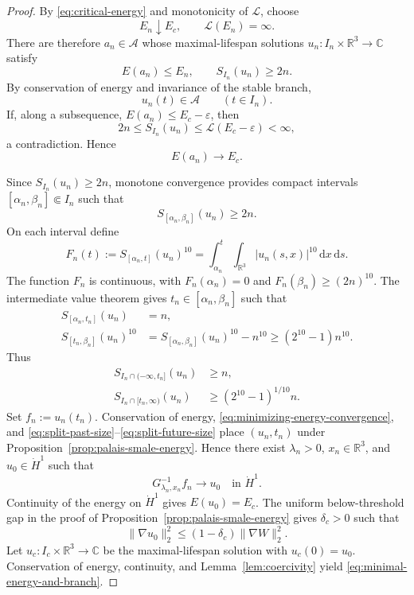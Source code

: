 \documentclass{interact}
\numberwithin{equation}{section}
\theoremstyle{plain}
\theoremstyle{definition}
\theoremstyle{remark}
\newcommand{\R}{\mathbb R}
\newcommand{\C}{\mathbb C}
\newcommand{\dd}{\,\mathrm d}
\begin{document}
\begin{proof}
By \eqref{eq:critical-energy} and monotonicity of $\mathcal L$, choose
\[
 E_n\downarrow E_c,
 \qquad
 \mathcal L(E_n)=\infty.
\]
There are therefore $a_n\in\mathcal A$ whose maximal-lifespan solutions $u_n:I_n\times\R^3\to\C$ satisfy
\[
 E(a_n)\le E_n,
 \qquad
 S_{I_n}(u_n)\ge2n.
\]
By conservation of energy and invariance of the stable branch,
\[
 u_n(t)\in\mathcal A
 \qquad(t\in I_n).
\]
If, along a subsequence, $E(a_n)\le E_c-\varepsilon$, then
\[
 2n
 \le S_{I_n}(u_n)
 \le\mathcal L(E_c-\varepsilon)
 <\infty,
\]
a contradiction. Hence
\begin{equation}\label{eq:minimizing-energy-convergence}
 E(a_n)\longrightarrow E_c.
\end{equation}

Since $S_{I_n}(u_n)\ge2n$, monotone convergence provides compact intervals $[\alpha_n,\beta_n]\Subset I_n$ such that
\[
 S_{[\alpha_n,\beta_n]}(u_n)\ge2n.
\]
On each interval define
\[
 F_n(t):=S_{[\alpha_n,t]}(u_n)^{10}
 =\int_{\alpha_n}^t\!\int_{\R^3}|u_n(s,x)|^{10}\dd x\dd s.
\]
The function $F_n$ is continuous, with $F_n(\alpha_n)=0$ and $F_n(\beta_n)\ge(2n)^{10}$. The intermediate value theorem gives $t_n\in[\alpha_n,\beta_n]$ such that
\begin{align*}
 S_{[\alpha_n,t_n]}(u_n)&=n,\\
 S_{[t_n,\beta_n]}(u_n)^{10}
 &=S_{[\alpha_n,\beta_n]}(u_n)^{10}-n^{10}
 \ge(2^{10}-1)n^{10}.
\end{align*}
Thus
\begin{align}
 S_{I_n\cap(-\infty,t_n]}(u_n)&\ge n,
 \label{eq:split-past-size}\\
 S_{I_n\cap[t_n,\infty)}(u_n)
 &\ge(2^{10}-1)^{1/10}n.
 \label{eq:split-future-size}
\end{align}
Set $f_n:=u_n(t_n)$. Conservation of energy, \eqref{eq:minimizing-energy-convergence}, and \eqref{eq:split-past-size}--\eqref{eq:split-future-size} place $(u_n,t_n)$ under Proposition~\ref{prop:palais-smale-energy}. Hence there exist $\lambda_n>0$, $x_n\in\R^3$, and $u_0\in\dot H^1$ such that
\[
 G_{\lambda_n,x_n}^{-1}f_n
 \longrightarrow u_0
 \quad\text{in }\dot H^1.
\]
Continuity of the energy on $\dot H^1$ gives $E(u_0)=E_c$. The uniform below-threshold gap in the proof of Proposition~\ref{prop:palais-smale-energy} gives $\delta_c>0$ such that
\[
 \|\nabla u_0\|_2^2
 \le(1-\delta_c)\|\nabla W\|_2^2.
\]
Let $u_c:I_c\times\R^3\to\C$ be the maximal-lifespan solution with $u_c(0)=u_0$. Conservation of energy, continuity, and Lemma~\ref{lem:coercivity} yield \eqref{eq:minimal-energy-and-branch}.


\end{proof}
\end{document}
